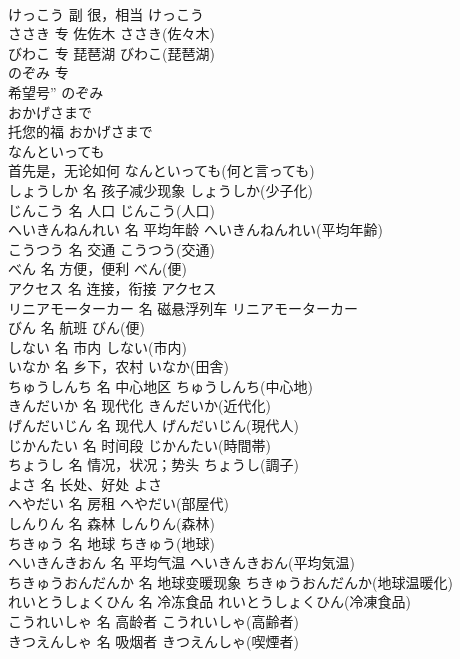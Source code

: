 \documentclass[8pt]{extreport}
\begin{document}
\begin{CJK}{UTF8}{min}
\\	けっこう	副	很，相当	けっこう	
\\	ささき	专	佐佐木	ささき(佐々木)	
\\	びわこ	专	琵琶湖	びわこ(琵琶湖)	
\\	のぞみ	专	
\\	希望号”	のぞみ	
\\	おかげさまで	
\\	托您的福	おかげさまで	
\\	なんといっても	
\\	首先是，无论如何	なんといっても(何と言っても)	
\\	しょうしか	名	孩子减少现象	しょうしか(少子化)	
\\	じんこう	名	人口	じんこう(人口)	
\\	へいきんねんれい	名	平均年龄	へいきんねんれい(平均年齢)	
\\	こうつう	名	交通	こうつう(交通)	
\\	べん	名	方便，便利	べん(便)	
\\	アクセス	名	连接，衔接	アクセス	
\\	リニアモーターカー	名	磁悬浮列车	リニアモーターカー	
\\	びん	名	航班	びん(便)	
\\	しない	名	市内	しない(市内)	
\\	いなか	名	乡下，农村	いなか(田舎)	
\\	ちゅうしんち	名	中心地区	ちゅうしんち(中心地)	
\\	きんだいか	名	现代化	きんだいか(近代化)	
\\	げんだいじん	名	现代人	げんだいじん(現代人)	
\\	じかんたい	名	时间段	じかんたい(時間帯)	
\\	ちょうし	名	情况，状况；势头	ちょうし(調子)	
\\	よさ	名	长处、好处	よさ	
\\	へやだい	名	房租	へやだい(部屋代)	
\\	しんりん	名	森林	しんりん(森林)	
\\	ちきゅう	名	地球	ちきゅう(地球)	
\\	へいきんきおん	名	平均气温	へいきんきおん(平均気温)	
\\	ちきゅうおんだんか	名	地球变暖现象	ちきゅうおんだんか(地球温暖化)	
\\	れいとうしょくひん	名	冷冻食品	れいとうしょくひん(冷凍食品)	
\\	こうれいしゃ	名	高龄者	こうれいしゃ(高齢者)	
\\	きつえんしゃ	名	吸烟者	きつえんしゃ(喫煙者)	

\end{CJK}
\end{document}
